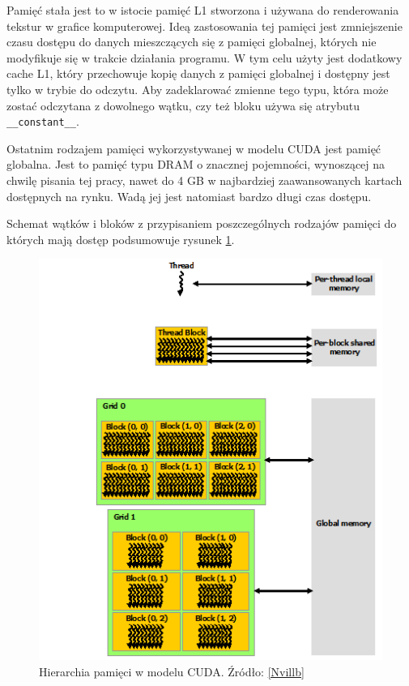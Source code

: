 Pamięć stała jest to w istocie pamięć L1 stworzona i używana do renderowania tekstur 
w grafice komputerowej. Ideą zastosowania tej pamięci jest zmniejszenie czasu
dostępu do danych mieszczących się z pamięci globalnej, których nie modyfikuje się w trakcie działania programu.
W tym celu użyty jest dodatkowy cache L1, który przechowuje kopię danych 
z pamięci globalnej i dostępny jest tylko w trybie do odczytu.
Aby zadeklarować zmienne tego typu, która może zostać odczytana z dowolnego
wątku, czy też bloku używa się atrybutu \texttt{\_\_constant\_\_}.

Ostatnim rodzajem pamięci wykorzystywanej w modelu CUDA jest pamięć globalna.
Jest to pamięć typu DRAM o znacznej pojemności, wynoszącej na chwilę pisania tej
pracy, nawet do 4 GB w najbardziej zaawansowanych kartach dostępnych na rynku. 
Wadą jej jest natomiast bardzo długi czas dostępu.

Schemat wątków i bloków z przypisaniem poszczególnych rodzajów pamięci do których
mają dostęp podsumowuje rysunek \ref{hier}.

\begin{figure}[H]
\centering
\includegraphics[scale=0.8]{images/memory-hierarchy.png}
\caption{Hierarchia pamięci w modelu CUDA. Źródło: \ref{Nvillb}}
\label{hier}
\end{figure}

